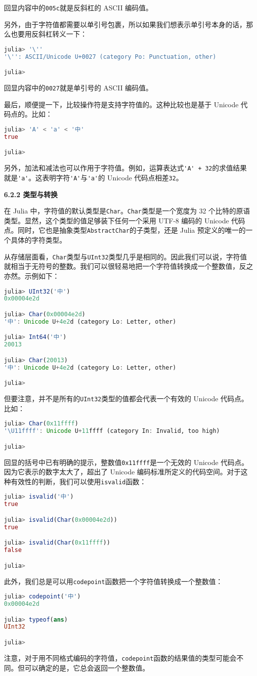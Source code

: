 回显内容中的\verb|005c|就是反斜杠的 ASCII 编码值。

另外，由于字符值都需要以单引号包裹，所以如果我们想表示单引号本身的话，那么也要用反斜杠转义一下：
\begin{lstlisting}[language=julia]
julia> '\''
'\'': ASCII/Unicode U+0027 (category Po: Punctuation, other)

julia> 
\end{lstlisting}

回显内容中的\verb|0027|就是单引号的 ASCII 编码值。

最后，顺便提一下，比较操作符是支持字符值的。这种比较也是基于 Unicode 代码点的。比如：
\begin{lstlisting}[language=julia]
julia> 'A' < 'a' < '中'
true

julia> 
\end{lstlisting}

另外，加法和减法也可以作用于字符值。例如，运算表达式\verb|'A' + 32|的求值结果就是\verb|'a'|。这表明字符\verb|'A'|与\verb|'a'|的 Unicode 代码点相差\verb|32|。

\textbf{6.2.2 类型与转换}

在 Julia 中，字符值的默认类型是\verb|Char|。\verb|Char|类型是一个宽度为 32 个比特的原语类型。显然，这个类型的值足够装下任何一个采用 UTF-8 编码的 Unicode 代码点。同时，它也是抽象类型\verb|AbstractChar|的子类型，还是 Julia 预定义的唯一的一个具体的字符类型。

从存储层面看，\verb|Char|类型与\verb|UInt32|类型几乎是相同的。因此我们可以说，字符值就相当于无符号的整数。我们可以很轻易地把一个字符值转换成一个整数值，反之亦然。示例如下：
\begin{lstlisting}[language=julia]
julia> UInt32('中')
0x00004e2d

julia> Char(0x00004e2d)
'中': Unicode U+4e2d (category Lo: Letter, other) 

julia> Int64('中')
20013

julia> Char(20013)
'中': Unicode U+4e2d (category Lo: Letter, other)

julia> 
\end{lstlisting}

但要注意，并不是所有的\verb|UInt32|类型的值都会代表一个有效的 Unicode 代码点。比如：
\begin{lstlisting}[language=julia]
julia> Char(0x11ffff)
'\U11ffff': Unicode U+11ffff (category In: Invalid, too high)

julia> 
\end{lstlisting}

回显的括号中已有明确的提示，整数值\verb|0x11ffff|是一个无效的 Unicode 代码点。因为它表示的数字太大了，超出了 Unicode 编码标准所定义的代码空间。对于这种有效性的判断，我们可以使用\verb|isvalid|函数：
\begin{lstlisting}[language=julia]
julia> isvalid('中')
true

julia> isvalid(Char(0x00004e2d))
true

julia> isvalid(Char(0x11ffff))
false

julia> 
\end{lstlisting}

此外，我们总是可以用\verb|codepoint|函数把一个字符值转换成一个整数值：
\begin{lstlisting}[language=julia]
julia> codepoint('中')
0x00004e2d

julia> typeof(ans)
UInt32

julia> 
\end{lstlisting}

注意，对于用不同格式编码的字符值，\verb|codepoint|函数的结果值的类型可能会不同。但可以确定的是，它总会返回一个整数值。